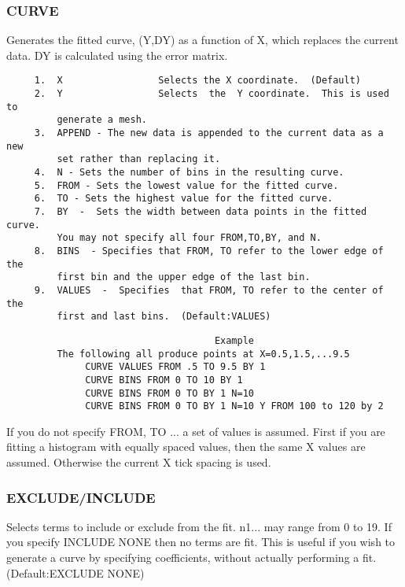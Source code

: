 \subsubsection{CURVE       }
Generates  the  fitted curve, (Y,DY) as a function of X, which replaces
the current data.  DY is calculated using the error matrix.  
\begin{verbatim}
     1.  X                 Selects the X coordinate.  (Default) 
     2.  Y                 Selects  the  Y coordinate.  This is used to
         generate a mesh.  
     3.  APPEND - The new data is appended to the current data as a new
         set rather than replacing it.  
     4.  N - Sets the number of bins in the resulting curve.  
     5.  FROM - Sets the lowest value for the fitted curve.  
     6.  TO - Sets the highest value for the fitted curve.  
     7.  BY  -  Sets the width between data points in the fitted curve.
         You may not specify all four FROM,TO,BY, and N.  
     8.  BINS  - Specifies that FROM, TO refer to the lower edge of the
         first bin and the upper edge of the last bin.  
     9.  VALUES  -  Specifies  that FROM, TO refer to the center of the
         first and last bins.  (Default:VALUES) 
\end{verbatim}

\begin{verbatim}
                                     Example
         The following all produce points at X=0.5,1.5,...9.5 
              CURVE VALUES FROM .5 TO 9.5 BY 1 
              CURVE BINS FROM 0 TO 10 BY 1 
              CURVE BINS FROM 0 TO BY 1 N=10 
              CURVE BINS FROM 0 TO BY 1 N=10 Y FROM 100 to 120 by 2 
\end{verbatim}

If  you do not specify FROM, TO ...  a set of values is assumed.  First
if you are fitting a histogram with equally  spaced  values,  then  the
same  X  values  are  assumed.  Otherwise the current X tick spacing is
used.  
\subsubsection{EXCLUDE/INCLUDE}
Selects  terms  to  include  or exclude from the fit.  n1...  may range
from 0 to 19.  If you specify INCLUDE NONE then no terms are fit.  This
is  useful  if you wish to generate a curve by specifying coefficients,
without actually performing a fit.  
(Default:EXCLUDE NONE) 
